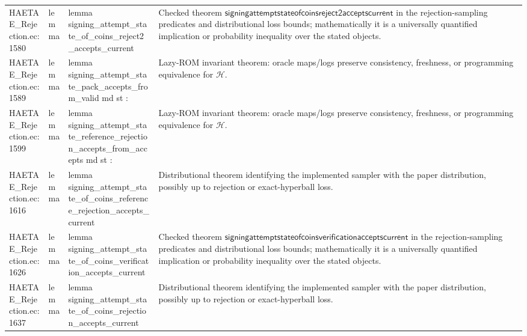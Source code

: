 \documentclass[10pt]{article}
\begin{document}
\begin{longtable}{L{0.11\textwidth}L{0.055\textwidth}L{0.385\textwidth}L{0.41\textwidth}}
HAETAE\_\allowbreak{}Rejection.\allowbreak{}ec:\allowbreak{}1580 & lemma & {\ttfamily\scriptsize lemma signing\_\allowbreak{}attempt\_\allowbreak{}state\_\allowbreak{}of\_\allowbreak{}coins\_\allowbreak{}reject2\_\allowbreak{}accepts\_\allowbreak{}current} & Checked theorem $\mathsf{signingattemptstateofcoinsreject2acceptscurrent}$ in the rejection-sampling predicates and distributional loss bounds; mathematically it is a universally quantified implication or probability inequality over the stated objects. \\
HAETAE\_\allowbreak{}Rejection.\allowbreak{}ec:\allowbreak{}1589 & lemma & {\ttfamily\scriptsize lemma signing\_\allowbreak{}attempt\_\allowbreak{}state\_\allowbreak{}pack\_\allowbreak{}accepts\_\allowbreak{}from\_\allowbreak{}valid md st :} & Lazy-ROM invariant theorem: oracle maps/logs preserve consistency, freshness, or programming equivalence for $\mathcal H$. \\
HAETAE\_\allowbreak{}Rejection.\allowbreak{}ec:\allowbreak{}1599 & lemma & {\ttfamily\scriptsize lemma signing\_\allowbreak{}attempt\_\allowbreak{}state\_\allowbreak{}reference\_\allowbreak{}rejection\_\allowbreak{}accepts\_\allowbreak{}from\_\allowbreak{}accepts md st :} & Lazy-ROM invariant theorem: oracle maps/logs preserve consistency, freshness, or programming equivalence for $\mathcal H$. \\
HAETAE\_\allowbreak{}Rejection.\allowbreak{}ec:\allowbreak{}1616 & lemma & {\ttfamily\scriptsize lemma signing\_\allowbreak{}attempt\_\allowbreak{}state\_\allowbreak{}of\_\allowbreak{}coins\_\allowbreak{}reference\_\allowbreak{}rejection\_\allowbreak{}accepts\_\allowbreak{}current} & Distributional theorem identifying the implemented sampler with the paper distribution, possibly up to rejection or exact-hyperball loss. \\
HAETAE\_\allowbreak{}Rejection.\allowbreak{}ec:\allowbreak{}1626 & lemma & {\ttfamily\scriptsize lemma signing\_\allowbreak{}attempt\_\allowbreak{}state\_\allowbreak{}of\_\allowbreak{}coins\_\allowbreak{}verification\_\allowbreak{}accepts\_\allowbreak{}current} & Checked theorem $\mathsf{signingattemptstateofcoinsverificationacceptscurrent}$ in the rejection-sampling predicates and distributional loss bounds; mathematically it is a universally quantified implication or probability inequality over the stated objects. \\
HAETAE\_\allowbreak{}Rejection.\allowbreak{}ec:\allowbreak{}1637 & lemma & {\ttfamily\scriptsize lemma signing\_\allowbreak{}attempt\_\allowbreak{}state\_\allowbreak{}of\_\allowbreak{}coins\_\allowbreak{}rejection\_\allowbreak{}accepts\_\allowbreak{}current} & Distributional theorem identifying the implemented sampler with the paper distribution, possibly up to rejection or exact-hyperball loss. \\

\end{longtable}
\end{document}

